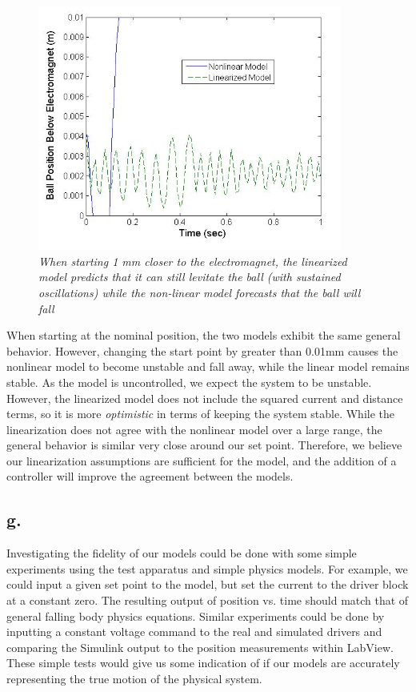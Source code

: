 \documentclass{article}
\theoremstyle{plain}
\theoremstyle{definition}
\theoremstyle{remark}
\begin{document}
\begin{figure}[htb]
\begin{center}
\includegraphics[width = 10cm]{Part1fFarDisturbance.jpg}
\caption{\emph{When starting 1 mm closer to the electromagnet, the linearized model predicts that it can still levitate the ball (with sustained oscillations) while the non-linear model forecasts that the ball will fall}}
\label{Q1_f3}
\end{center}
\end{figure}

When starting at the nominal position, the two models exhibit the same general behavior. However, changing the start point by greater than 0.01mm causes the nonlinear model to become unstable and fall away, while the linear model remains stable.  As the model is uncontrolled, we expect the system to be unstable. However, the linearized model does not include the squared current and distance terms, so it is more \emph{optimistic} in terms of keeping the system stable. While the linearization does not agree with the nonlinear model over a large range, the general behavior is similar very close around our set point. Therefore, we believe our linearization assumptions are sufficient for the model, and the addition of a controller will improve the agreement between the models.

\subsection*{g.}
Investigating the fidelity of our models could be done with some simple experiments using the test apparatus and simple physics models. For example, we could input a given set point to the model, but set the current to the driver block at a constant zero. The resulting output of position vs. time should match that of general falling body physics equations. Similar experiments could be done by inputting a constant voltage command to the real and simulated drivers and comparing the Simulink output to the position measurements within LabView. These simple tests would give us some indication of if our models are accurately representing the true motion of the physical system.\\
\end{document}
